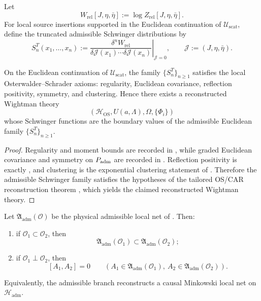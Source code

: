 \begin{definition}
\label{def:admissible-schwinger-functions}
Let
\[
W_{\mathrm{rel}}[J,\eta,\bar\eta]:=\log Z_{\mathrm{rel}}[J,\eta,\bar\eta].
\]
For local source insertions supported in the Euclidean continuation of
$\mathcal U_{\mathrm{scat}}$, define the truncated admissible Schwinger distributions by
\[
S_n^T(x_1,\ldots,x_n)
:=
\left.
\frac{\delta^n W_{\mathrm{rel}}}{\delta\mathcal J(x_1)\cdots\delta\mathcal J(x_n)}
\right|_{\mathcal J=0},
\qquad
\mathcal J:=(J,\eta,\bar\eta).
\]
\end{definition}

\begin{theorem}
\label{thm:full-admissible-os-closure}
On the Euclidean continuation of $\mathcal U_{\mathrm{scat}}$, the family
$\{S_n^T\}_{n\ge 1}$ satisfies the local Osterwalder--Schrader axioms: regularity, Euclidean
covariance, reflection positivity, symmetry, and clustering. Hence there exists a reconstructed
Wightman theory
\[
(\mathcal H_{\mathrm{OS}},U(a,\Lambda),\Omega,\{\Phi_i\})
\]
whose Schwinger functions are the boundary values of the admissible Euclidean family
$\{S_n^T\}_{n\ge 1}$.
\end{theorem}

\begin{proof}
Regularity and moment bounds are recorded in
, while graded Euclidean covariance and symmetry on $P_{\mathrm{adm}}$ are
recorded in . Reflection positivity is exactly
, and clustering is the exponential clustering statement
of . Therefore the admissible Schwinger family satisfies
the hypotheses of the tailored OS/CAR reconstruction theorem
, which yields the claimed reconstructed Wightman theory.
\end{proof}

\begin{theorem}
\label{thm:admissible-local-minkowski-net}
Let $\mathfrak A_{\mathrm{adm}}(\mathcal O)$ be the physical admissible local net of
. Then:
\begin{enumerate}[label=\textup{(\roman*)}, leftmargin=1.8em, topsep=3pt, itemsep=2pt]
    \item if $\mathcal O_1\subset\mathcal O_2$, then
    \[
    \mathfrak A_{\mathrm{adm}}(\mathcal O_1)\subset \mathfrak A_{\mathrm{adm}}(\mathcal O_2);
    \]
    \item if $\mathcal O_1\perp\mathcal O_2$, then
    \[
    [A_1,A_2]=0
    \qquad
    (A_1\in\mathfrak A_{\mathrm{adm}}(\mathcal O_1),\ A_2\in\mathfrak A_{\mathrm{adm}}(\mathcal O_2)).
    \]
\end{enumerate}
Equivalently, the admissible branch reconstructs a causal Minkowski local net on
$\mathcal H_{\mathrm{adm}}$.
\end{theorem}

